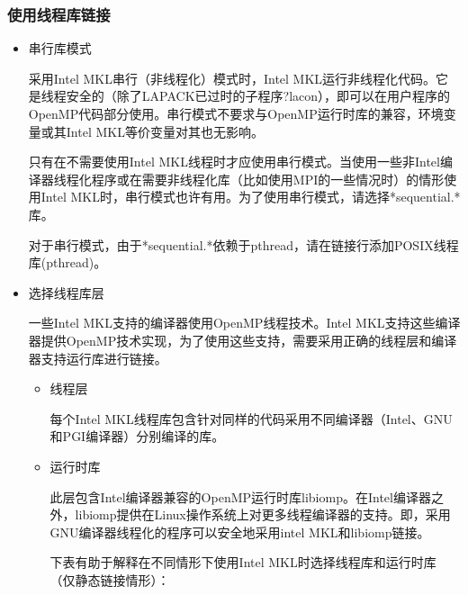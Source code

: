 \documentclass[a4paper,12pt,english]{sphinxmanual}
\begin{document}
\subsubsection{使用线程库链接}
\label{\detokenize{intel-mkl/intel-mkl:id16}}\begin{itemize}
\item {} 
\sphinxAtStartPar
串行库模式

\sphinxAtStartPar
采用Intel MKL串行（非线程化）模式时，Intel MKL运行非线程化代码。它是线程安全的（除了LAPACK已过时的子程序?lacon），即可以在用户程序的OpenMP代码部分使用。串行模式不要求与OpenMP运行时库的兼容，环境变量或其Intel MKL等价变量对其也无影响。

\sphinxAtStartPar
只有在不需要使用Intel MKL线程时才应使用串行模式。当使用一些非Intel编译器线程化程序或在需要非线程化库（比如使用MPI的一些情况时）的情形使用Intel MKL时，串行模式也许有用。为了使用串行模式，请选择*sequential.*库。

\sphinxAtStartPar
对于串行模式，由于*sequential.*依赖于pthread，请在链接行添加POSIX线程库(pthread)。

\item {} 
\sphinxAtStartPar
选择线程库层

\sphinxAtStartPar
一些Intel MKL支持的编译器使用OpenMP线程技术。Intel MKL支持这些编译器提供OpenMP技术实现，为了使用这些支持，需要采用正确的线程层和编译器支持运行库进行链接。
\begin{itemize}
\item {} 
\sphinxAtStartPar
线程层

\sphinxAtStartPar
每个Intel MKL线程库包含针对同样的代码采用不同编译器（Intel、GNU和PGI编译器）分别编译的库。

\item {} 
\sphinxAtStartPar
运行时库

\sphinxAtStartPar
此层包含Intel编译器兼容的OpenMP运行时库libiomp。在Intel编译器之外，libiomp提供在Linux操作系统上对更多线程编译器的支持。即，采用GNU编译器线程化的程序可以安全地采用intel MKL和libiomp链接。

\sphinxAtStartPar
下表有助于解释在不同情形下使用Intel MKL时选择线程库和运行时库（仅静态链接情形）：



\end{itemize}
\end{itemize}
\end{document}
